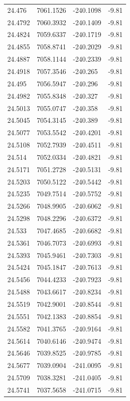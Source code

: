 \begin{table}[H]
\begin{tabular}{llll}
24.476 & 7061.1526 & -240.1098 & -9.81 \\
24.4792 & 7060.3932 & -240.1409 & -9.81 \\
24.4824 & 7059.6337 & -240.1719 & -9.81 \\
24.4855 & 7058.8741 & -240.2029 & -9.81 \\
24.4887 & 7058.1144 & -240.2339 & -9.81 \\
24.4918 & 7057.3546 & -240.265 & -9.81 \\
24.495 & 7056.5947 & -240.296 & -9.81 \\
24.4982 & 7055.8348 & -240.327 & -9.81 \\
24.5013 & 7055.0747 & -240.358 & -9.81 \\
24.5045 & 7054.3145 & -240.389 & -9.81 \\
24.5077 & 7053.5542 & -240.4201 & -9.81 \\
24.5108 & 7052.7939 & -240.4511 & -9.81 \\
24.514 & 7052.0334 & -240.4821 & -9.81 \\
24.5171 & 7051.2728 & -240.5131 & -9.81 \\
24.5203 & 7050.5122 & -240.5442 & -9.81 \\
24.5235 & 7049.7514 & -240.5752 & -9.81 \\
24.5266 & 7048.9905 & -240.6062 & -9.81 \\
24.5298 & 7048.2296 & -240.6372 & -9.81 \\
24.533 & 7047.4685 & -240.6682 & -9.81 \\
24.5361 & 7046.7073 & -240.6993 & -9.81 \\
24.5393 & 7045.9461 & -240.7303 & -9.81 \\
24.5424 & 7045.1847 & -240.7613 & -9.81 \\
24.5456 & 7044.4233 & -240.7923 & -9.81 \\
24.5488 & 7043.6617 & -240.8234 & -9.81 \\
24.5519 & 7042.9001 & -240.8544 & -9.81 \\
24.5551 & 7042.1383 & -240.8854 & -9.81 \\
24.5582 & 7041.3765 & -240.9164 & -9.81 \\
24.5614 & 7040.6146 & -240.9474 & -9.81 \\
24.5646 & 7039.8525 & -240.9785 & -9.81 \\
24.5677 & 7039.0904 & -241.0095 & -9.81 \\
24.5709 & 7038.3281 & -241.0405 & -9.81 \\
24.5741 & 7037.5658 & -241.0715 & -9.81 \\

\end{tabular}
\end{table}
